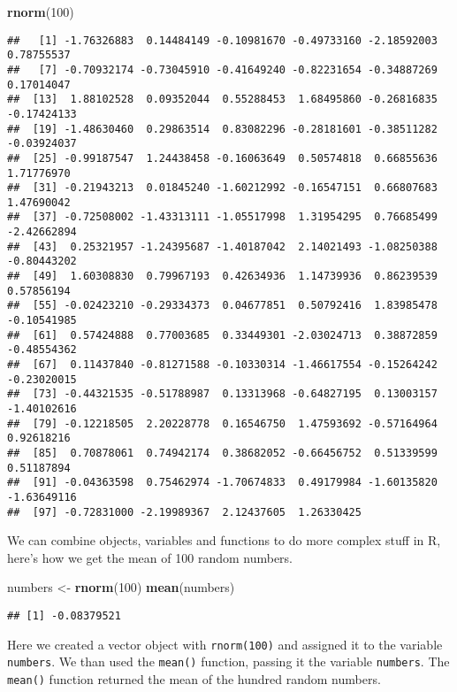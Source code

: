 \documentclass[
]{book}
\newenvironment{Shaded}{\begin{snugshade}}{\end{snugshade}}
\newcommand{\DecValTok}[1]{\textcolor[rgb]{0.00,0.00,0.81}{#1}}
\newcommand{\KeywordTok}[1]{\textcolor[rgb]{0.13,0.29,0.53}{\textbf{#1}}}
\newcommand{\NormalTok}[1]{#1}
\newcommand{\StringTok}[1]{\textcolor[rgb]{0.31,0.60,0.02}{#1}}
\begin{document}
\begin{Shaded}
\begin{Highlighting}[]
\KeywordTok{rnorm}\NormalTok{(}\DecValTok{100}\NormalTok{)}
\end{Highlighting}
\end{Shaded}

\begin{verbatim}
##   [1] -1.76326883  0.14484149 -0.10981670 -0.49733160 -2.18592003  0.78755537
##   [7] -0.70932174 -0.73045910 -0.41649240 -0.82231654 -0.34887269  0.17014047
##  [13]  1.88102528  0.09352044  0.55288453  1.68495860 -0.26816835 -0.17424133
##  [19] -1.48630460  0.29863514  0.83082296 -0.28181601 -0.38511282 -0.03924037
##  [25] -0.99187547  1.24438458 -0.16063649  0.50574818  0.66855636  1.71776970
##  [31] -0.21943213  0.01845240 -1.60212992 -0.16547151  0.66807683  1.47690042
##  [37] -0.72508002 -1.43313111 -1.05517998  1.31954295  0.76685499 -2.42662894
##  [43]  0.25321957 -1.24395687 -1.40187042  2.14021493 -1.08250388 -0.80443202
##  [49]  1.60308830  0.79967193  0.42634936  1.14739936  0.86239539  0.57856194
##  [55] -0.02423210 -0.29334373  0.04677851  0.50792416  1.83985478 -0.10541985
##  [61]  0.57424888  0.77003685  0.33449301 -2.03024713  0.38872859 -0.48554362
##  [67]  0.11437840 -0.81271588 -0.10330314 -1.46617554 -0.15264242 -0.23020015
##  [73] -0.44321535 -0.51788987  0.13313968 -0.64827195  0.13003157 -1.40102616
##  [79] -0.12218505  2.20228778  0.16546750  1.47593692 -0.57164964  0.92618216
##  [85]  0.70878061  0.74942174  0.38682052 -0.66456752  0.51339599  0.51187894
##  [91] -0.04363598  0.75462974 -1.70674833  0.49179984 -1.60135820 -1.63649116
##  [97] -0.72831000 -2.19989367  2.12437605  1.26330425
\end{verbatim}

We can combine objects, variables and functions to do more complex stuff in R, here's how we get the mean of 100 random numbers.

\begin{Shaded}
\begin{Highlighting}[]
\NormalTok{numbers <-}\StringTok{ }\KeywordTok{rnorm}\NormalTok{(}\DecValTok{100}\NormalTok{)}
\KeywordTok{mean}\NormalTok{(numbers)}
\end{Highlighting}
\end{Shaded}

\begin{verbatim}
## [1] -0.08379521
\end{verbatim}

Here we created a vector object with \texttt{rnorm(100)} and assigned it to the variable \texttt{numbers}. We than used the \texttt{mean()} function, passing it the variable \texttt{numbers}. The \texttt{mean()} function returned the mean of the hundred random numbers.
\end{document}

